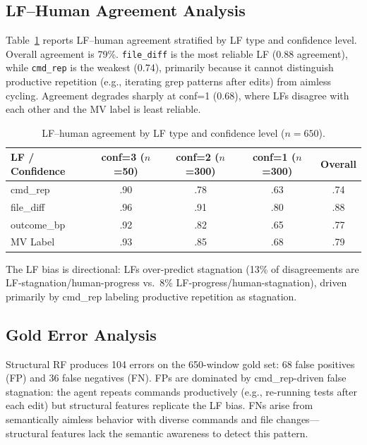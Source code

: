 \documentclass[11pt]{article}
\begin{document}
\subsection{LF--Human Agreement Analysis}
\label{sec:lf_agreement}

Table~\ref{tab:lf_agreement} reports LF--human agreement stratified by LF type and confidence level.
Overall agreement is 79\%.
\texttt{file\_diff} is the most reliable LF (0.88 agreement), while \texttt{cmd\_rep} is the weakest (0.74), primarily because it cannot distinguish productive repetition (e.g., iterating grep patterns after edits) from aimless cycling.
Agreement degrades sharply at conf=1 (0.68), where LFs disagree with each other and the MV label is least reliable.

\begin{table}[t]
\centering
\caption{LF--human agreement by LF type and confidence level ($n{=}650$).}
\label{tab:lf_agreement}
\small
\begin{tabular}{lcccc}
\toprule
\textbf{LF / Confidence} & \textbf{conf=3} ($n$=50) & \textbf{conf=2} ($n$=300) & \textbf{conf=1} ($n$=300) & \textbf{Overall} \\
\midrule
cmd\_rep     & .90 & .78 & .63 & .74 \\
file\_diff   & .96 & .91 & .80 & .88 \\
outcome\_bp  & .92 & .82 & .65 & .77 \\
\midrule
MV Label     & .93 & .85 & .68 & .79 \\
\bottomrule
\end{tabular}
\end{table}

The LF bias is directional: LFs over-predict stagnation (13\% of disagreements are LF-stagnation/human-progress vs.\ 8\% LF-progress/human-stagnation), driven primarily by cmd\_rep labeling productive repetition as stagnation.

\subsection{Gold Error Analysis}
\label{sec:error_analysis}

Structural RF produces 104 errors on the 650-window gold set: 68 false positives (FP) and 36 false negatives (FN).
FPs are dominated by cmd\_rep-driven false stagnation: the agent repeats commands productively (e.g., re-running tests after each edit) but structural features replicate the LF bias.
FNs arise from semantically aimless behavior with diverse commands and file changes---structural features lack the semantic awareness to detect this pattern.
\end{document}
